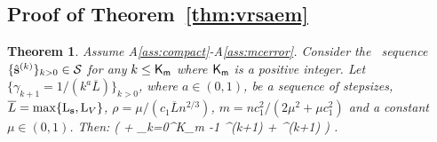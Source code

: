 \documentclass[journal, 11pt]{IEEEtran}
\newtheorem*{Theorem*}{Theorem}
\begin{document}
\subsection{Proof of Theorem~\ref{thm:vrsaem}}\label{app:theoremvrsaem}
\begin{Theorem*}
Assume A\ref{ass:compact}-A\ref{ass:mcerror}.
Consider the \SAEMVR\ sequence $\{\hat{{\mathbf{s}}}^{(k)}\}_{k>0} \in \mathcal{S}$ for any $k \leq {\sf K}_{\sf m }$ where ${\sf K}_{\sf m }$ is a positive integer. 
Let $\{\gamma_{k+1} = 1/(k^a \overline{L})\}_{k>0}$, where $a \in (0,1)$, be a sequence of stepsizes, $\overline{L} = \max \{\operatorname{L}_{{\mathbf{s}}}, \operatorname{L}_{V} \}$, $\rho = \mu/( c_1 \overline{L}  n^{2/3})$, $m = n c_1^2/(2 \mu^2+\mu c_1^2)$ and a constant $\mu \in (0,1)$. Then:
\beq\notag
\EE[ \| \grd V( \hs{K} ) \|^2 ] \leq  {}\left( \EE[ \Delta V ]+  \sum_{k=0}^{{\sf K}_{\sf m }-1}  \tilde{\eta}^{(k+1)}\hspace{-0.1cm} + \chi^{(k+1)} \EE[\| \hs{k} - \tilde{S}^{(k)}\|^2]\right)  \eqsp.
\eeq
\end{Theorem*} 
\end{document}
